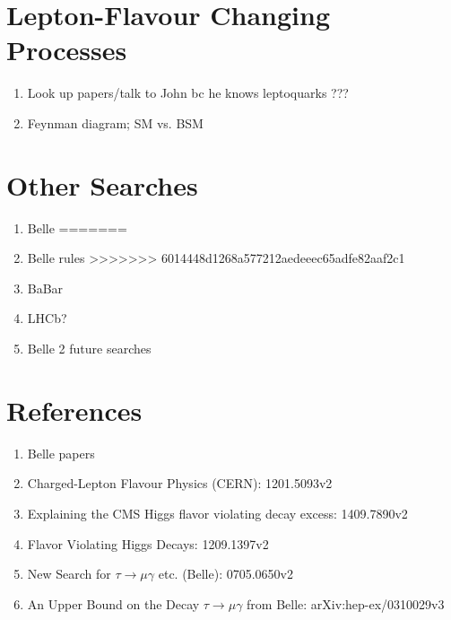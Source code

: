 \documentclass[a4paper]{article} %
\begin{document}
\section{Lepton-Flavour Changing Processes}
\begin{enumerate}
\item Look up papers/talk to John bc he knows leptoquarks ???
\item Feynman diagram; SM vs. BSM
\end{enumerate}

\section{Other Searches}
\begin{enumerate}
<<<<<<< HEAD
\item Belle
=======
\item Belle rules
>>>>>>> 6014448d1268a577212aedeeec65adfe82aaf2c1
\item BaBar
\item LHCb?
\item Belle 2 future searches
\end{enumerate}

\section{References}
\begin{enumerate}
\item Belle papers
\item Charged-Lepton Flavour Physics (CERN): 1201.5093v2
\item Explaining the CMS Higgs flavor violating decay excess: 1409.7890v2
\item Flavor Violating Higgs Decays: 1209.1397v2
\item New Search for $\tau\to\mu\gamma$ etc. (Belle): 0705.0650v2
\item An Upper Bound on the Decay $\tau\to\mu\gamma$ from Belle: arXiv:hep-ex/0310029v3
\end{enumerate}





\pagebreak



\end{document}
